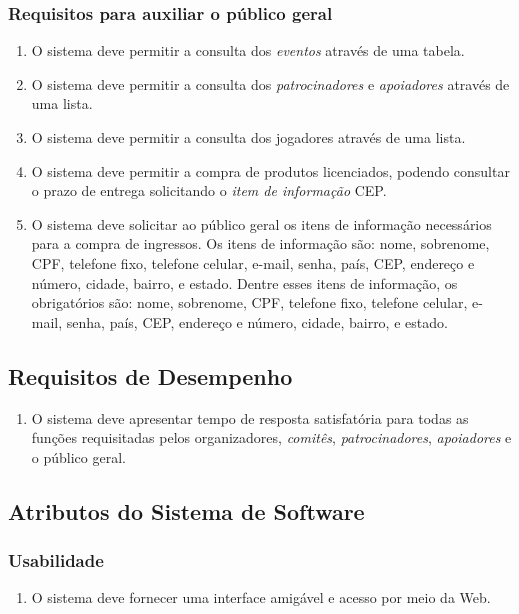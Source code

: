 \documentclass[
10pt, %
a4paper, %
oneside, %
headinclude,footinclude, %
BCOR5mm, %
]{scrartcl}
\begin{document}
\subsubsection{Requisitos para auxiliar o público geral}
\begin{enumerate}[noitemsep]
	\item O sistema deve permitir a consulta dos \textit{eventos} através de uma tabela.
	\item O sistema deve permitir a consulta dos \textit{patrocinadores} e \textit{apoiadores} através de uma lista.
	\item O sistema deve permitir a consulta dos jogadores através de uma lista.
	\item O sistema deve permitir a compra de produtos licenciados, podendo consultar o prazo de entrega solicitando o \textit{item de informação} CEP.
	\item O sistema deve solicitar ao público geral os itens de informação necessários para a compra de ingressos. Os itens de informação são: nome, sobrenome, CPF, telefone fixo, telefone celular, e-mail, senha, país, CEP, endereço e número, cidade, bairro, e estado. Dentre esses itens de informação, os obrigatórios são: nome, sobrenome, CPF, telefone fixo, telefone celular, e-mail, senha, país, CEP, endereço e número, cidade, bairro, e estado.
\end{enumerate}

\subsection{Requisitos de Desempenho}
\begin{enumerate}[noitemsep]
	\item O sistema deve apresentar tempo de resposta satisfatória para todas as funções requisitadas pelos organizadores, \textit{comitês}, \textit{patrocinadores}, \textit{apoiadores} e o público geral.
\end{enumerate}

\subsection{Atributos do Sistema de Software}
\subsubsection{Usabilidade}
\begin{enumerate}[noitemsep]
	\item O sistema deve fornecer uma interface amigável e acesso por meio da Web.
\end{enumerate}
\end{document}
